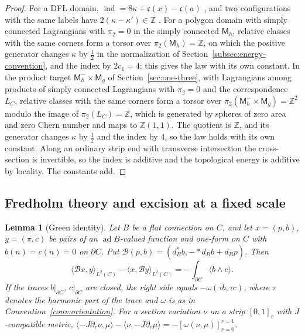 \documentclass[11pt]{amsart}
\newtheorem{lemma}[theorem]{Lemma}
\theoremstyle{definition}
\theoremstyle{remark}
\theoremstyle{plain}
\numberwithin{equation}{section}
\newcommand{\ZZ}{\mathbb{Z}}
\newcommand{\ad}{\operatorname{ad}}
\newcommand{\ind}{\operatorname{ind}}
\newcommand{\Msf}{\mathsf{M}}
\begin{document}
\begin{proof}
For a DFL domain, $\ind=8\kappa+\mathfrak c(x)-\mathfrak c(a)$
\cite[Proposition~3.20]{DFL}, and two configurations with the same labels
have $2(\kappa-\kappa')\in\ZZ$ \cite[Lemma~3.15]{DFL}. For a polygon domain
with simply connected Lagrangians with $\pi_2=0$ in the simply connected
$\Msf_h$, relative classes with the same corners form a torsor over
$\pi_2(\Msf_h)=\ZZ$, on which the positive generator changes $\kappa$ by
$\frac12$ in the normalization of Section~\ref{subsec:energy-convention}, and
the index by $2c_1=4$; this
gives the law with its own constant. In the product target
$\Msf_h^-\times\Msf_g$ of Section~\ref{sec:one-three}, with Lagrangians among
products of simply connected Lagrangians with $\pi_2=0$ and the correspondence
$L_C$, relative classes with the same corners form a torsor over
$\pi_2(\Msf_h^-\times\Msf_g)=\ZZ^2$ modulo the image of $\pi_2(L_C)=\ZZ$, which is
generated by spheres of zero area and zero Chern number and maps to
$\ZZ(1,1)$. The quotient is $\ZZ$, and its generator changes $\kappa$ by $\frac12$ and
the index by $4$, so the law holds with its own constant. Along an
ordinary strip end with
transverse intersection the cross-section is invertible, so the index is
additive \cite[Proposition~3.9]{Donaldson-book} and the topological
energy is additive by locality. The constants add.
\end{proof}

\subsection{Fredholm theory and excision at a fixed scale}

\begin{lemma}[Green identity]\label{lem:green}
Let $B$ be a flat connection on $C$, and let $x=(p,b)$, $y=(\pi,c)$ be
pairs of an $\ad B$-valued function and one-form on $C$ with
$b(n)=c(n)=0$ on $\partial C$. Put $\mathcal B(p,b)=(d_B^*b,
-*d_Bb+d_Bp)$. Then
\[
\langle\mathcal Bx,y\rangle_{L^2(C)}-\langle x,\mathcal By\rangle_{L^2(C)}
=-\int_{\partial C}\langle b\wedge c\rangle .
\]
If the traces $b|_{\partial C}$, $c|_{\partial C}$ are closed, the
right side equals $-\omega(\tau b,\tau c)$, where $\tau$ denotes the
harmonic part of the trace and $\omega$ is as in
Convention~\ref{conv:orientation}. For a section variation $\nu$ on a
strip $[0,1]_r$ with $J$-compatible metric,
$\langle-J\partial_r\nu,\mu\rangle-\langle\nu,-J\partial_r\mu\rangle
=-[\omega(\nu,\mu)]_{r=0}^{r=1}$.
\end{lemma}
\end{document}
